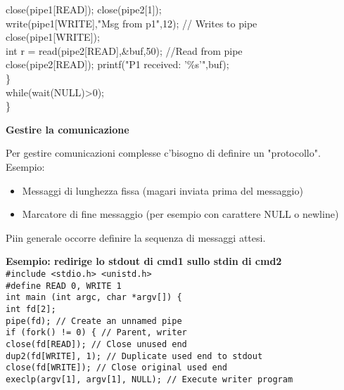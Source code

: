 \begin{flushleft}
\begin{flushleft}
\begin{flushleft}
\begin{flushleft}
{                \tab close(pipe1[READ]); close(pipe2[1]);\\
                \tab write(pipe1[WRITE],"Msg from p1",12); // Writes to pipe\\
                \tab close(pipe1[WRITE]);\\
                \tab int r = read(pipe2[READ],\&buf,50); //Read from pipe\\
                \tab close(pipe2[READ]); printf("P1 received: '\%s'\n",buf);\\
                \halftab \} \\
                \halftab while(wait(NULL)>0);\\
                \}}
      \end{flushleft}
    \end{flushleft}
    \begin{flushleft}
      \textbf{Gestire la comunicazione}\par
      Per gestire comunicazioni complesse c'\ace bisogno di definire un "protocollo". Esempio:
      \begin{itemize}
        \item Messaggi di lunghezza fissa (magari inviata prima del messaggio)
        \item Marcatore di fine messaggio (per esempio con carattere NULL o newline)
      \end{itemize}
      Pi\acu in generale occorre definire la sequenza di messaggi attesi.
    \end{flushleft}
    \begin{flushleft}
      \textbf{Esempio: redirige lo stdout di cmd1 sullo stdin di cmd2}\\
      \texttt{\#include <stdio.h> <unistd.h> \\
      \#define READ 0, WRITE 1 \\
      int main (int argc, char *argv[]) \{\\
      \halftab int fd[2];\\
      \halftab pipe(fd); // Create an unnamed pipe \\
      \halftab if (fork() != 0) \{ // Parent, writer\\
      \tab close(fd[READ]); // Close unused end \\
      \tab dup2(fd[WRITE], 1); // Duplicate used end to stdout \\
      \tab close(fd[WRITE]); // Close original used end \\
      \tab execlp(argv[1], argv[1], NULL); // Execute writer program \\
}
\end{flushleft}
\end{flushleft}
\end{flushleft}
